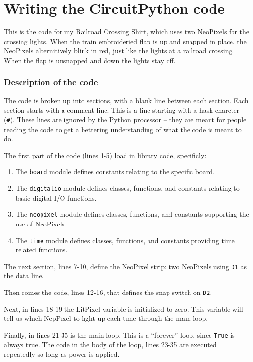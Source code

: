 \documentclass[letterpaper,twoside,12pt]{article}
\begin{document}
\part{Writing the CircuitPython code}

This is the code for my Railroad Crossing Shirt, which uses two NeoPixels for 
the crossing lights.  When the train embroideried flap is up and snapped in 
place, the NeoPixels alternitively blink in red, just like the lights at a 
railroad crossing.  When the flap is unsnapped and down the lights stay off.
\section{Description of the code}

The code is broken up into sections, with a blank line between each section.
Each section starts with a comment line. This is a line starting with a hash
charcter (\texttt{\#}). These lines are ignored by the Python processor -- they
are meant for people reading the code to get a bettering understanding of what
the code is meant to do.

The first part of the code (lines 1-5) load in library code, specificly:
\begin{enumerate}
\item The \texttt{board} module defines constants relating to the specific 
board.
\item The \texttt{digitalio} module defines classes, functions, and constants 
relating to basic digital I/O functions.
\item The \texttt{neopixel} module defines classes, functions, and constants 
supporting the use of NeoPixels.
\item The \texttt{time} module defines classes, functions, and constants 
providing time related functions.
\end{enumerate}

The next section, lines 7-10, define the NeoPixel strip: two NeoPixels using 
\texttt{D1} as the data line.

Then comes the code, lines 12-16, that defines the snap switch on \texttt{D2}.

Next, in lines 18-19 the LitPixel variable is initialized to zero. This
variable will tell us which NepPixel to light up each time through the main
loop.

Finally, in lines 21-35 is the main loop. This is a ``forever'' loop, since
\texttt{True} is always true. The code in the body of the loop, lines 23-35
are executed repeatedly so long as power is applied.
\end{document}
